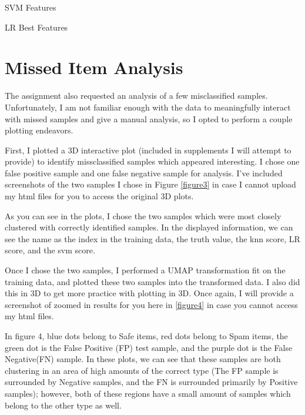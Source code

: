 \documentclass[12pt]{article}
\begin{document}
\begin{table}
  \parbox{.5\textwidth}{
    
    \caption{SVM Features}
    \label{table3}}
    \parbox{.5\textwidth}{
      
      \caption{LR Best Features}
      \label{table4}}
\end{table}

\section{Missed Item Analysis}
The assignment also requested an analysis of a few misclassified samples. Unfortunately, I am not familiar enough with the 
data to meaningfully interact with missed samples and give a manual analysis, so I opted to perform a couple plotting endeavors.

First, I plotted a 3D interactive plot (included in supplements I will attempt to provide) to identify missclassified samples 
which appeared interesting. I chose one false positive sample and one false negative sample for analysis.
I've included screenshots of the two samples I chose in Figure \ref{figure3} in case I cannot upload my html files for you 
to access the original 3D plots.

As you can see in the plots, I chose the two samples which were most closely clustered with correctly identified samples. In 
the displayed information, we can see the name as the index in the training data, the truth value, the knn score, LR score, and 
the svm score.

Once I chose the two samples, I performed a UMAP transformation fit on the training data, and plotted these two samples into 
the transformed data. I also did this in 3D to get more practice with plotting in 3D. Once again, I will provide a screenshot 
of zoomed in results for you here in \ref{figure4} in case you cannot access my html files. 

In figure 4, blue dots belong to Safe items, red dots belong to Spam items, the green dot is the False Positive (FP) test sample, and 
the purple dot is the False Negative(FN) sample. In these plots, we can see that these samples are both clustering in an area of 
high amounts of the correct type (The FP sample is surrounded by Negative samples, and the FN is surrounded primarily by Positive samples);
however, both of these regions have a small amount of samples which belong to the other type as well. 
\end{document}

